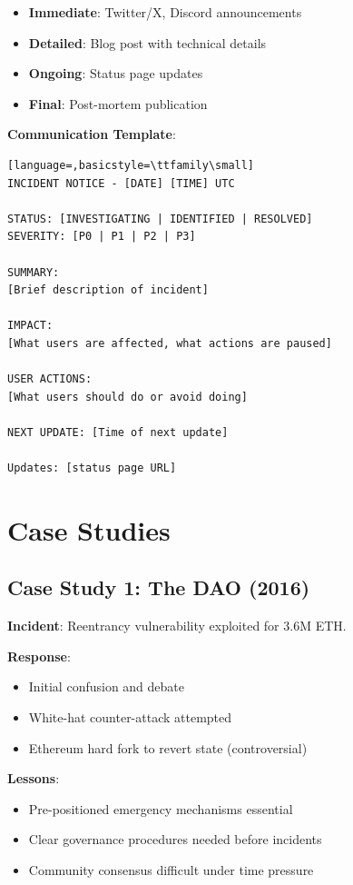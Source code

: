 \documentclass[11pt,a4paper]{article}
\theoremstyle{definition}
\begin{document}
\begin{itemize}
    \item \textbf{Immediate}: Twitter/X, Discord announcements
    \item \textbf{Detailed}: Blog post with technical details
    \item \textbf{Ongoing}: Status page updates
    \item \textbf{Final}: Post-mortem publication
\end{itemize}

\textbf{Communication Template}:
\begin{lstlisting}[language=,basicstyle=\ttfamily\small]
INCIDENT NOTICE - [DATE] [TIME] UTC

STATUS: [INVESTIGATING | IDENTIFIED | RESOLVED]
SEVERITY: [P0 | P1 | P2 | P3]

SUMMARY:
[Brief description of incident]

IMPACT:
[What users are affected, what actions are paused]

USER ACTIONS:
[What users should do or avoid doing]

NEXT UPDATE: [Time of next update]

Updates: [status page URL]
\end{lstlisting}

\section{Case Studies}

\subsection{Case Study 1: The DAO (2016)}

\textbf{Incident}: Reentrancy vulnerability exploited for 3.6M ETH.

\textbf{Response}:
\begin{itemize}
    \item Initial confusion and debate
    \item White-hat counter-attack attempted
    \item Ethereum hard fork to revert state (controversial)
\end{itemize}

\textbf{Lessons}:
\begin{itemize}
    \item Pre-positioned emergency mechanisms essential
    \item Clear governance procedures needed before incidents
    \item Community consensus difficult under time pressure
\end{itemize}
\end{document}
